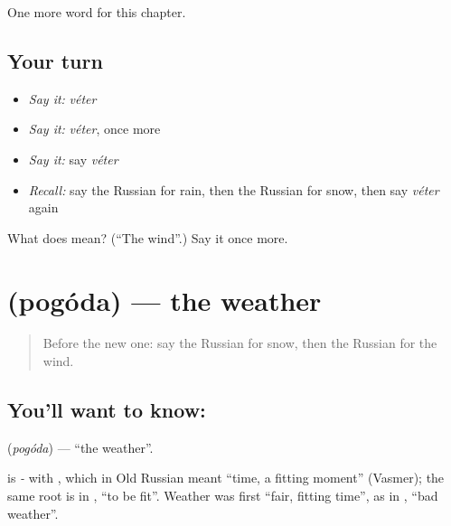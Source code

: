 \begin{grammarlens}[title={What you've built}]
One more word for this chapter.
\end{grammarlens}

\subsection*{Your turn}
\begin{itemize}
\raggedright
  \item \emph{Say it:} \emph{véter}
  \item \emph{Say it:} \emph{véter}, once more
  \item \emph{Say it:} say \emph{véter}
  \item \emph{Recall:} say the Russian for rain, then the Russian for snow, then say \emph{véter} again
\end{itemize}

\begin{tcolorbox}[breakable,colback=teal!4,colframe=teal!35!black,title={Before you move on}]
What does  mean? (\textquotedblleft{}The wind\textquotedblright{}.) Say it once more.
\end{tcolorbox}
\section[\texorpdfstring{\ru{погода} (pogóda)}{погода (pogóda)}]{ (pogóda) — the weather}

\label{lesson:RU-C59-weather}



\begin{quote}
Before the new one: say the Russian for snow, then the Russian for the wind.
\end{quote}

\subsection*{You'll want to know: }
\textbf{} (\emph{pogóda}) — \textquotedblleft{}the weather\textquotedblright{}.

\begin{cousinweb}
\textbf{} is \emph{-} with \emph{}, which in Old Russian meant \textquotedblleft{}time, a fitting moment\textquotedblright{} (Vasmer); the same root is in \emph{}, \textquotedblleft{}to be fit\textquotedblright{}. Weather was first \textquotedblleft{}fair, fitting time\textquotedblright{}, as in \emph{}, \textquotedblleft{}bad weather\textquotedblright{}.
\end{cousinweb}

